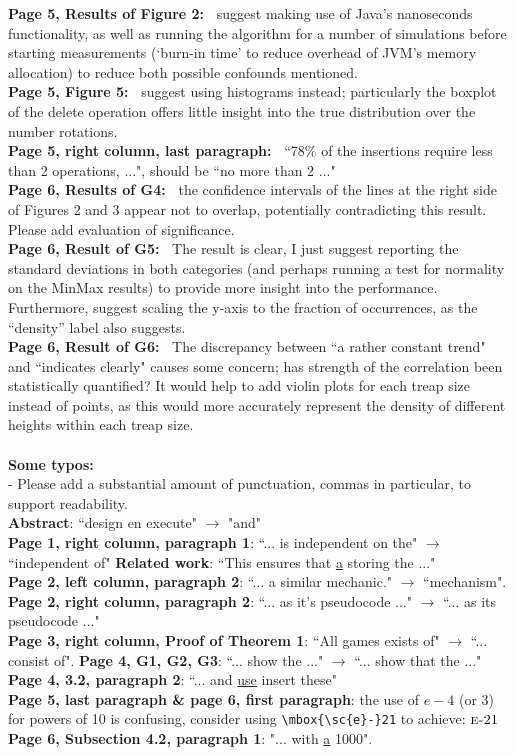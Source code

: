 \documentclass[11pt,a4paper,oneside,fleqn]{article}
\begin{document}
\textbf{Page 5, Results of Figure 2:~} suggest making use of Java's nanoseconds functionality, as well as running the algorithm for a number of simulations before starting measurements (`burn-in time' to reduce overhead of JVM's memory allocation) to reduce both possible confounds mentioned. \\
\textbf{Page 5, Figure 5:~} suggest using histograms instead; particularly the boxplot of the delete operation offers little insight into the true distribution over the number rotations. \\
\textbf{Page 5, right column, last paragraph:~} ``78\% of the insertions require less than 2 operations, ...", should be ``no more than 2 ..." \\
\textbf{Page 6, Results of G4:~} the confidence intervals of the lines at the right side of Figures 2 and 3 appear not to overlap, potentially contradicting this result. Please add evaluation of significance. \\
\textbf{Page 6, Result of G5:~} The result is clear, I just suggest reporting the standard deviations in both categories (and perhaps running a test for normality on the MinMax results) to provide more insight into the performance. Furthermore, suggest scaling the y-axis to the fraction of occurrences, as the ``density'' label also suggests. \\
\textbf{Page 6, Result of G6:~} The discrepancy between ``a rather constant trend" and ``indicates clearly" causes some concern; has strength of the correlation been statistically quantified? It would help to add violin plots for each treap size instead of points, as this would more accurately represent the density of different heights within each treap size. \\ \\
\textbf{Some typos:} ~\\
- Please add a substantial amount of punctuation, commas in particular, to support readability. \\
\textbf{Abstract}: ``design en execute" $\to$ "and" \\
\textbf{Page 1, right column, paragraph 1}: ``... is independent on the" $\to$ ``independent of"
\textbf{Related work}: ``This ensures that \underline{a} storing the ..." \\
\textbf{Page 2, left column, paragraph 2}: ``... a similar mechanic." $\to$ ``mechanism".
\textbf{Page 2, right column, paragraph 2}: ``... as it's pseudocode ..." $\to$ ``... as its pseudocode ..." \\
\textbf{Page 3, right column, Proof of Theorem 1}: ``All games exists of" $\to$ ``... consist of".
\textbf{Page 4, G1, G2, G3}: ``... show the ..." $\to$ ``... show that the ..." \\
\textbf{Page 4, 3.2, paragraph 2}: ``... and \underline{use} insert these" \\
\textbf{Page 5, last paragraph \& page 6, first paragraph}: the use of $e - 4$ (or 3) for powers of 10 is confusing, consider using \verb+\mbox{\sc{e}-}21+ to achieve: $\mbox{\sc{e}-}21$ \\
\textbf{Page 6, Subsection 4.2, paragraph 1}: "... with \underline{a} 1000".
\end{document}
